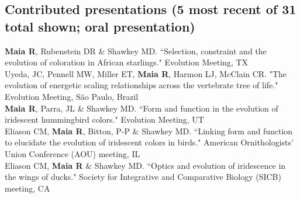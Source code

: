 \documentclass[10pt]{article}
\newcommand{\years}[1]{\marginnote{\raggedleft\scriptsize #1}}
\begin{document}
\subsection*{Contributed presentations (5 most recent of 31 total shown; \dag oral presentation)}

\years{2016} \dag  \textbf{Maia R}, Rubenstein DR \& Shawkey MD. “Selection, constraint and the evolution of coloration in African starlings." Evolution Meeting, TX\\

\years{2015} \dag Uyeda, JC, Pennell MW, Miller ET, \textbf{Maia R}, Harmon LJ, McClain CR. "The evolution of energetic scaling relationships across the vertebrate tree of life." Evolution Meeting, S\~ao Paulo, Brazil\\

\years{2013} \textbf{Maia R}, Parra, JL \& Shawkey MD. “Form and function in the evolution of iridescent hummingbird colors." Evolution Meeting, UT\\

\years{} \dag Eliason CM, \textbf{Maia R}, Bitton, P-P \& Shawkey MD. “Linking form and function to elucidate the evolution of iridescent colors in birds." American Ornithologists' Union Conference (\textsc{AOU}) meeting, IL\\

\years{} \dag Eliason CM, \textbf{Maia R} \& Shawkey MD. “Optics and evolution of iridescence in the wings of ducks." Society for Integrative and Comparative Biology (\textsc{SICB}) meeting, CA\\


\end{document}
